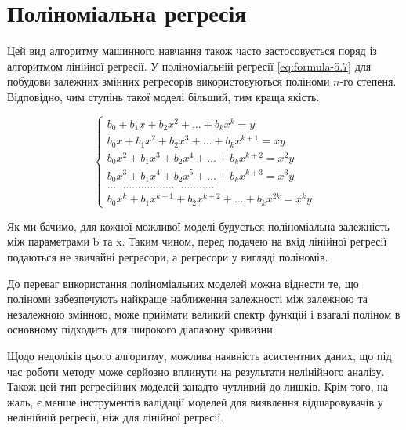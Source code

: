 \section{Поліноміальна регресія}
Цей вид алгоритму машинного навчання також часто застосовується поряд із
алгоритмом лінійної регресії. У поліноміальній регресії \eqref{eq:formula-5.7}
для побудови залежних змінних регресорів використовуються поліноми $n$-го
степеня. Відповідно, чим ступінь такої моделі більший, тим краща якість.

\begin{equation}
	\begin{cases}
		b_{0} + b_{1} x + b_{2} x^{2} + \dots + b_{k} x^{k} = y                   \\
		b_{0} x + b_{1} x^{2} + b_{2} x^{3} + \dots + b_{k} x^{k+1}= xy           \\
		b_{0} x^{2} + b_{1} x^{3} + b_{2} x^{4} + \dots + b_{k} x^{k+2}= x^{2} y  \\
		b_{0} x^{3} + b_{1} x^{4} + b_{2} x^{5} + \dots + b_{k} x^{k+3}= x^{3} y  \\
		\dots \dots \dots \dots \dots \dots \dots \dots \dots \dots \dots \dots   \\
		b_{0} x^{k} + b_{1} x^{k+1}+ b_{2} x^{k+2}+ \dots + b_{k} x^{2k}= x^{k} y
	\end{cases}
	\label{eq:formula-5.7}
\end{equation}

Як ми бачимо, для кожної можливої моделі будується поліноміальна залежність між
параметрами b та x. Таким чином, перед подачею на вхід лінійної регресії подаються
не звичайні регресори, а регресори у вигляді поліномів.

До переваг використання поліноміальних моделей можна віднести те, що поліноми забезпечують
найкраще наближення залежності між залежною та незалежною змінною, може приймати великий
спектр функцій і взагалі поліном в основному підходить для широкого діапазону кривизни.

Щодо недоліків цього алгоритму, можлива наявність асистентних даних, що під час
роботи методу може серйозно вплинути на результати нелінійного аналізу. Також цей
тип регресійних моделей занадто чутливий до лишків. Крім того, на жаль, є менше
інструментів валідації моделей для виявлення відшаровувачів у нелінійній
регресії, ніж для лінійної регресії.
